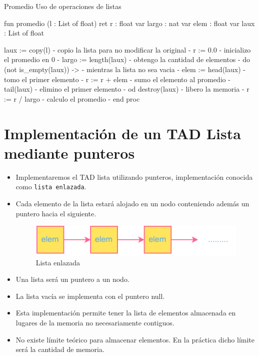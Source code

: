 \begin{codebox}{Promedio}
\footnotesize Uso de operaciones de listas
\tcblower
\begin{pascallike}
fun promedio (l : List of float) ret r : float
    var largo : nat
    var elem : float
    var laux : List of float

    laux := copy(l) {- copio la lista para no modificar la original -}
    r := 0.0 {- inicializo el promedio en 0 -}
    largo := length(laux) {- obtengo la cantidad de elementos -}
    do (not is_empty(laux)) -> {- mientras la lista no sea vacia -}
        elem := head(laux) {- tomo el primer elemento -}
        r := r + elem {- sumo el elemento al promedio -}
        tail(laux) {- elimino el primer elemento -}
    od
    destroy(laux) {- libero la memoria -}
    r := r / largo {- calculo el promedio -}
end proc
\end{pascallike}
\end{codebox}

\section{Implementación de un TAD Lista mediante punteros}
\begin{itemize}
    \item Implementaremos el TAD lista utilizando punteros, implementación conocida como \texttt{lista enlazada}.
    \item Cada elemento de la lista estará alojado en un nodo conteniendo además un puntero hacia el siguiente.
    \begin{figure}[h]
        \centering
        \includegraphics[scale=1]{./estáticos/node.pdf}
        \caption{Lista enlazada}
        \label{fig:my_label}
    \end{figure}
    \item Una lista será un puntero a un nodo.
    \item La lista vacía se implementa con el puntero null.
    \item Esta implementación permite tener la lista de elementos almacenada en lugares de la memoria no necesariamente contiguos.
    \item No existe límite teórico para almacenar elementos. En la práctica dicho límite será la cantidad de memoria.    
\end{itemize}

